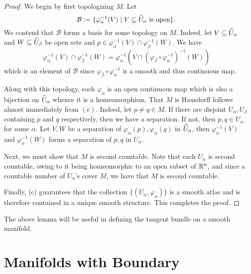 \begin{proof}
    We begin by first topologizing $M$. Let 
    \begin{equation*}
        \mathcal B := \{\varphi_\alpha^{-1}(V)\mid V\subseteq\widehat{U}_\alpha\text{ is open}\}.
    \end{equation*}
    We contend that $\mathcal B$ forms a basis for some topology on $M$. Indeed, let $V\subseteq\widehat{U}_\alpha$ and $W\subseteq\widehat{U}_\beta$ be open sets and $p\in\varphi_\alpha^{-1}(V)\cap\varphi_\beta^{-1}(W)$. We have 
    \begin{equation*}
        \varphi_\alpha^{-1}(V)\cap\varphi_\beta^{-1}(W) = \varphi_\alpha^{-1}(V\cap(\varphi_\beta\circ\varphi_\alpha^{-1})^{-1}(W))
    \end{equation*}
    which is an element of $\mathcal B$ since $\varphi_\beta\circ\varphi_\alpha^{-1}$ is a smooth and thus continuous map.

    Along with this topology, each $\varphi_\alpha$ is an open continuous map which is also a bijection on $\widehat{U}_\alpha$ whence it is a homeomorphism. That $M$ is Hausdorff follows almost immediately from $(e)$. Indeed, let $p\ne q\in M$. If there are disjoint $U_\alpha, U_\beta$ containing $p$ and $q$ respectively, then we have a separation. If not, then $p,q\in U_\alpha$ for some $\alpha$. Let $V, W$ be a separation of $\varphi_\alpha(p),\varphi_\alpha(q)$ in $\widehat{U}_\alpha$, then $\varphi_\alpha^{-1}(V)$ and $\varphi_\alpha^{-1}(W)$ forms a separation of $p,q$ in $U_\alpha$. 

    Next, we must show that $M$ is second countable. Note that each $U_\alpha$ is second countable, owing to it being homeomorphic to an open subset of $\mathbb{R}^n$, and since a countable number of $U_\alpha$'s cover $M$, we have that $M$ is second countable.

    Finally, (c) guarantees that the collection $\{(U_\alpha,\varphi_\alpha)\}$ is a smooth atlas and is therefore contained in a unique smooth structure. This completes the proof.
\end{proof}

The above lemma will be useful in defining the tangent bundle on a smooth manifold.

\section{Manifolds with Boundary}

